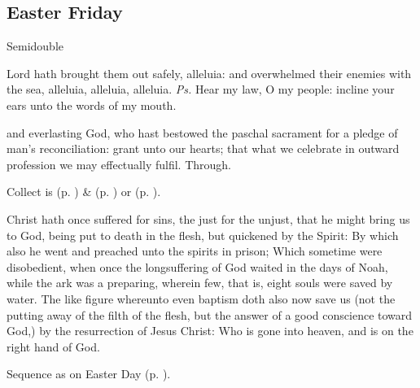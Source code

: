 \subsection{Easter Friday}
\begin{inhead}
    {Semidouble}
\end{inhead}


\introit
{} Lord hath brought them out safely, alleluia: and overwhelmed their enemies with the sea, alleluia, alleluia, alleluia. \textit{Ps.} Hear my law, O my people: incline your ears unto the words of my mouth.

\collect
{} and everlasting God, who hast bestowed the paschal sacrament for a pledge of man's reconciliation: grant unto our hearts; that what we celebrate in outward profession we may effectually fulfil. Through.
\begin{rubric}
     Collect is  (p. \pageref{EasterCollect}) \&   (p. \pageref{SPAgainst}) or  (p. \pageref{SPChiefBishop}).
\end{rubric}

 Christ hath once suffered for sins, the just for the unjust, that he might bring us to God, being put to death in the flesh, but quickened by the Spirit: By which also he went and preached unto the spirits in prison; Which sometime were disobedient, when once the longsuffering of God waited in the days of Noah, while the ark was a preparing, wherein few, that is, eight souls were saved by water. The like figure whereunto even baptism doth also now save us (not the putting away of the filth of the flesh, but the answer of a good conscience toward God,) by the resurrection of Jesus Christ: Who is gone into heaven, and is on the right hand of God.


\begin{rubric}
    Sequence as on Easter Day (p. \pageref{PaschalSequence}).
\end{rubric}

